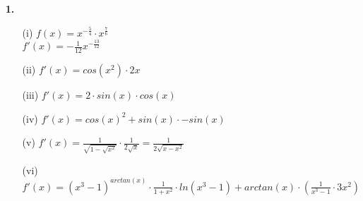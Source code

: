 \documentclass[a4paper,11pt]{scrartcl}
\author{\authorinfo}
\title{\titleinfo}
\date{\today}
\begin{document}
\maketitle
\begin{enumerate}
    \item[\textbf{1.}]
        \begin{enumerate}
            \item[(i)]
                \(f(x) = x^{-\frac{5}{4}} \cdot x^\frac{7}{6}\) \\
                \(f'(x)= -\frac{1}{12}x^{-\frac{13}{12}}\)
            \item[(ii)]
                \(f'(x)= cos(x^2) \cdot 2x\)
            \item[(iii)]
                \(f'(x)= 2 \cdot sin(x) \cdot cos(x)\)
            \item[(iv)]
                \(f'(x)= cos(x)^2 + sin(x) \cdot - sin(x)\)
            \item[(v)]  
                \(f'(x)= \frac{1}{\sqrt{1-\sqrt{x^2}}} \cdot \frac{1}{2 \sqrt{x}} = \frac{1}{2 \sqrt{x-x^2}}\)
            \item[(vi)]
                \(f'(x)= (x^3 - 1)^{arctan(x)} \cdot \frac{1}{1+x^2} \cdot ln(x^3 - 1) + arctan(x) \cdot \left( \frac{1}{x^3-1} \cdot 3x^2 \right) \)
        \end{enumerate}


\end{enumerate}
\end{document}
